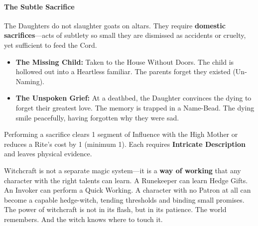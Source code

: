 \paragraph{The Subtle Sacrifice}
The Daughters do not slaughter goats on altars. They require \textbf{domestic sacrifices}---acts of subtlety so small they are dismissed as accidents or cruelty, yet sufficient to feed the Cord.

\begin{itemize}
    \item \textbf{The Missing Child:} Taken to the House Without Doors. The child is hollowed out into a Heartless familiar. The parents forget they existed (Un-Naming).
    \item \textbf{The Unspoken Grief:} At a deathbed, the Daughter convinces the dying to forget their greatest love. The memory is trapped in a Name-Bead. The dying smile peacefully, having forgotten why they were sad.
\end{itemize}

Performing a sacrifice clears 1 segment of Influence with the High Mother or reduces a Rite's cost by 1 (minimum 1). Each requires \textbf{Intricate Description} and leaves physical evidence.

\begin{tcolorbox}[colback=gray!5!white, colframe=black, title=Player Takeaway,breakable]
Witchcraft is not a separate magic system---it is a \textbf{way of working} that any character with the right talents can learn. A Runekeeper can learn Hedge Gifts. An Invoker can perform a Quick Working. A character with no Patron at all can become a capable hedge-witch, tending thresholds and binding small promises. The power of witchcraft is not in its flash, but in its patience. The world remembers. And the witch knows where to touch it.
\end{tcolorbox}